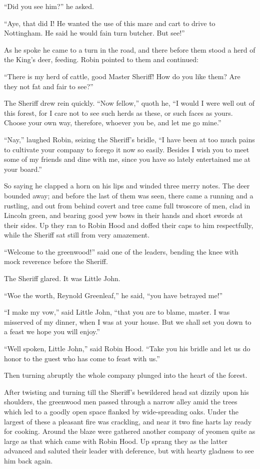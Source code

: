 ``Did you see him?'' he asked.

``Aye, that did I! He wanted the use of this mare and cart to drive to
Nottingham. He said he would fain turn butcher. But see!''

As he spoke he came to a turn in the road, and there before them stood a
herd of the King's deer, feeding. Robin pointed to them and continued:

``There is my herd of cattle, good Master Sheriff! How do you like them?
Are they not fat and fair to see?''

The Sheriff drew rein quickly. ``Now fellow,'' quoth he, ``I would I
were well out of this forest, for I care not to see such herds as these,
or such faces as yours. Choose your own way, therefore, whoever you be,
and let me go mine.''

``Nay,'' laughed Robin, seizing the Sheriff's bridle, ``I have been at
too much pains to cultivate your company to forego it now so easily.
Besides I wish you to meet some of my friends and dine with me, since
you have so lately entertained me at your board.''

So saying he clapped a horn on his lips and winded three merry notes.
The deer bounded away; and before the last of them was seen, there came
a running and a rustling, and out from behind covert and tree came full
twoscore of men, clad in Lincoln green, and bearing good yew bows in
their hands and short swords at their sides. Up they ran to Robin Hood
and doffed their caps to him respectfully, while the Sheriff sat still
from very amazement.

``Welcome to the greenwood!'' said one of the leaders, bending the knee
with mock reverence before the Sheriff.

The Sheriff glared. It was Little John.

``Woe the worth, Reynold Greenleaf,'' he said, ``you have betrayed me!''

``I make my vow,'' said Little John, ``that you are to blame, master. I
was misserved of my dinner, when I was at your house. But we shall set
you down to a feast we hope you will enjoy.''

``Well spoken, Little John,'' said Robin Hood. ``Take you his bridle and
let us do honor to the guest who has come to feast with us.''

Then turning abruptly the whole company plunged into the heart of the
forest.

After twisting and turning till the Sheriff's bewildered head sat
dizzily upon his shoulders, the greenwood men passed through a narrow
alley amid the trees which led to a goodly open space flanked by
wide-spreading oaks. Under the largest of these a pleasant fire was
crackling, and near it two fine harts lay ready for cooking. Around the
blaze were gathered another company of yeomen quite as large as that
which came with Robin Hood. Up sprang they as the latter advanced and
saluted their leader with deference, but with hearty gladness to see him
back again.


